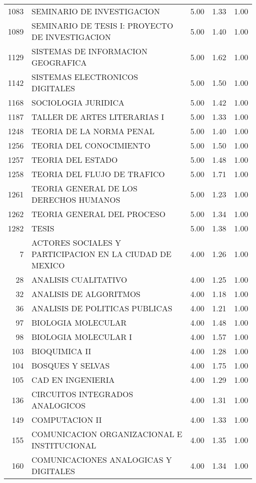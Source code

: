 \begin{table}[ht]
\begin{tabular}{rlrrr}
  1083 & SEMINARIO DE INVESTIGACION & 5.00 & 1.33 & 1.00 \\ 
  1089 & SEMINARIO DE TESIS I: PROYECTO DE INVESTIGACION & 5.00 & 1.40 & 1.00 \\ 
  1129 & SISTEMAS DE INFORMACION GEOGRAFICA & 5.00 & 1.62 & 1.00 \\ 
  1142 & SISTEMAS ELECTRONICOS DIGITALES & 5.00 & 1.50 & 1.00 \\ 
  1168 & SOCIOLOGIA JURIDICA & 5.00 & 1.42 & 1.00 \\ 
  1187 & TALLER DE ARTES LITERARIAS I & 5.00 & 1.33 & 1.00 \\ 
  1248 & TEORIA DE LA NORMA PENAL & 5.00 & 1.40 & 1.00 \\ 
  1256 & TEORIA DEL CONOCIMIENTO & 5.00 & 1.50 & 1.00 \\ 
  1257 & TEORIA DEL ESTADO & 5.00 & 1.48 & 1.00 \\ 
  1258 & TEORIA DEL FLUJO DE TRAFICO & 5.00 & 1.71 & 1.00 \\ 
  1261 & TEORIA GENERAL DE LOS DERECHOS HUMANOS & 5.00 & 1.23 & 1.00 \\ 
  1262 & TEORIA GENERAL DEL PROCESO & 5.00 & 1.34 & 1.00 \\ 
  1282 & TESIS & 5.00 & 1.38 & 1.00 \\ 
  7 & ACTORES SOCIALES Y PARTICIPACION EN LA CIUDAD DE MEXICO & 4.00 & 1.26 & 1.00 \\ 
  28 & ANALISIS CUALITATIVO & 4.00 & 1.25 & 1.00 \\ 
  32 & ANALISIS DE ALGORITMOS & 4.00 & 1.18 & 1.00 \\ 
  36 & ANALISIS DE POLITICAS PUBLICAS & 4.00 & 1.21 & 1.00 \\ 
  97 & BIOLOGIA MOLECULAR & 4.00 & 1.48 & 1.00 \\ 
  98 & BIOLOGIA MOLECULAR I & 4.00 & 1.57 & 1.00 \\ 
  103 & BIOQUIMICA II & 4.00 & 1.28 & 1.00 \\ 
  104 & BOSQUES Y SELVAS & 4.00 & 1.75 & 1.00 \\ 
  105 & CAD EN INGENIERIA & 4.00 & 1.29 & 1.00 \\ 
  136 & CIRCUITOS INTEGRADOS ANALOGICOS & 4.00 & 1.31 & 1.00 \\ 
  149 & COMPUTACION II & 4.00 & 1.33 & 1.00 \\ 
  155 & COMUNICACION ORGANIZACIONAL E INSTITUCIONAL & 4.00 & 1.35 & 1.00 \\ 
  160 & COMUNICACIONES ANALOGICAS Y DIGITALES & 4.00 & 1.34 & 1.00 \\ 

\end{tabular}
\end{table}
